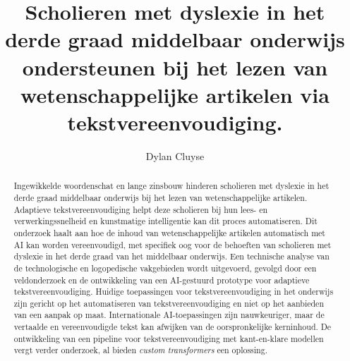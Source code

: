 \documentclass{hogent-article}
\title{Scholieren met dyslexie in het derde graad middelbaar onderwijs ondersteunen bij het lezen van wetenschappelijke artikelen via tekstvereenvoudiging.}
\author{Dylan Cluyse}
\begin{document}
	
\begin{abstract}
Ingewikkelde woordenschat en lange zinsbouw hinderen scholieren met dyslexie in het derde graad middelbaar onderwijs bij het lezen van wetenschappelijke artikelen. Adaptieve tekstvereenvoudiging helpt deze scholieren bij hun lees- en verwerkingssnelheid en kunstmatige intelligentie kan dit proces automatiseren. Dit onderzoek haalt aan hoe de inhoud van wetenschappelijke artikelen automatisch  met AI kan worden vereenvoudigd, met specifiek oog voor de behoeften van scholieren met dyslexie in het derde graad van het middelbaar onderwijs. Een technische analyse van de technologische en logopedische vakgebieden wordt uitgevoerd, gevolgd door een veldonderzoek en de ontwikkeling van een AI-gestuurd prototype voor adaptieve tekstvereenvoudiging. Huidige toepassingen voor tekstvereenvoudiging in het onderwijs zijn gericht op het automatiseren van tekstvereenvoudiging en niet op het aanbieden van een aanpak op maat. Internationale AI-toepassingen zijn nauwkeuriger, maar de vertaalde en vereenvoudigde tekst kan afwijken van de oorspronkelijke kerninhoud. De ontwikkeling van een pipeline voor tekstvereenvoudiging met kant-en-klare modellen vergt verder onderzoek, al bieden \textit{custom transformers} een oplossing.
\end{abstract}

\tableofcontents



\printbibliography[heading=bibintoc]
\end{document}
